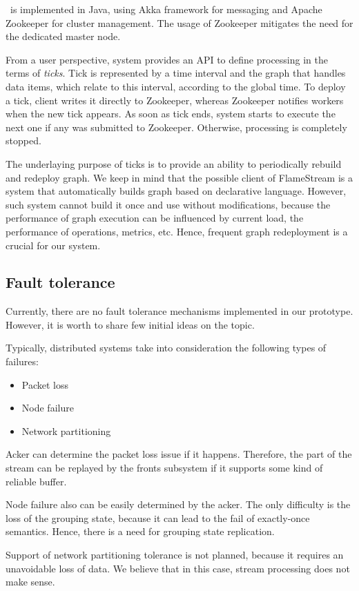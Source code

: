 \label{fs-impl}

\FlameStream\ is implemented in Java, using Akka framework for messaging and Apache Zookeeper for cluster management. The usage of Zookeeper mitigates the need for the dedicated master node.

From a user perspective, system provides an API to define processing in the terms of {\it ticks}. Tick is represented by a time interval and the graph that handles data items, which relate to this interval, according to the global time. To deploy a tick, client writes it directly to Zookeeper, whereas Zookeeper notifies workers when the new tick appears. As soon as tick ends, system starts to execute the next one if any was submitted to Zookeeper. Otherwise, processing is completely stopped.

The underlaying purpose of ticks is to provide an ability to periodically rebuild and redeploy graph. We keep in mind that the possible client of FlameStream is a system that automatically builds graph based on declarative language. However, such system cannot build it once and use without modifications, because the performance of graph execution can be influenced by current load, the performance of operations, metrics, etc. Hence, frequent graph redeployment is a crucial for our system. 

\subsection{Fault tolerance}
Currently, there are no fault tolerance mechanisms implemented in our prototype. However, it is worth to share few initial ideas on the topic.

Typically, distributed systems take into consideration the following types of failures:
\begin{itemize}
    \item Packet loss
    \item Node failure
    \item Network partitioning
\end{itemize}

Acker can determine the packet loss issue if it happens. Therefore, the part of the stream can be replayed by the fronts subsystem if it supports some kind of reliable buffer.

Node failure also can be easily determined by the acker. The only difficulty is the loss of the grouping state, because it can lead to the fail of exactly-once semantics. Hence, there is a need for grouping state replication.

Support of network partitioning tolerance is not planned, because it requires an unavoidable loss of data. We believe that in this case, stream processing does not make sense.

